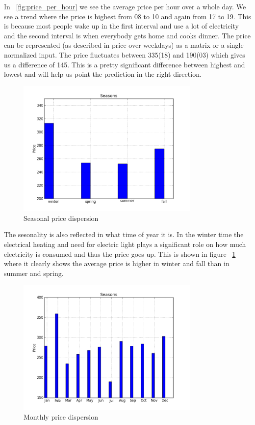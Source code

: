 In ~\ref{fig:price_per_hour} we see the average price per hour over a whole day. We see a trend where the price is highest from 08 to 10 and again from 17 to 19. This is because most people wake up in the first interval and use a lot of electricity and the second interval is when everybody gets home and cooks dinner. The price can be represented (as described in price-over-weekdays) as a matrix or a single normalized input. The price fluctuates between 335(18) and 190(03) which gives us a difference of 145. This is a pretty significant difference between highest and lowest and will help us point the prediction in the right direction.

\begin{figure}[H]
\centering
\includegraphics[width=0.8\textwidth ,natwidth=410,natheight=237]{billeder/energy_price_plots/seasons.png}
\caption{Seasonal price dispersion}
\label{fig:seasons}
\end{figure}

The sesonality is also reflected in what time of year it is. In the winter time the electrical heating and need for electric light plays a significant role on how much electricity is consumed and thus the price goes up. This is shown in figure ~\ref{fig:seasons} where it clearly shows the average price is higher in winter and fall than in summer and spring.

\begin{figure}[H]
\centering
\includegraphics[width=0.8\textwidth ,natwidth=410,natheight=237]{billeder/energy_price_plots/averageMonthlyPrice.png}
\caption{Monthly price dispersion}
\label{fig:monthlyAveragePrice}
\end{figure}

